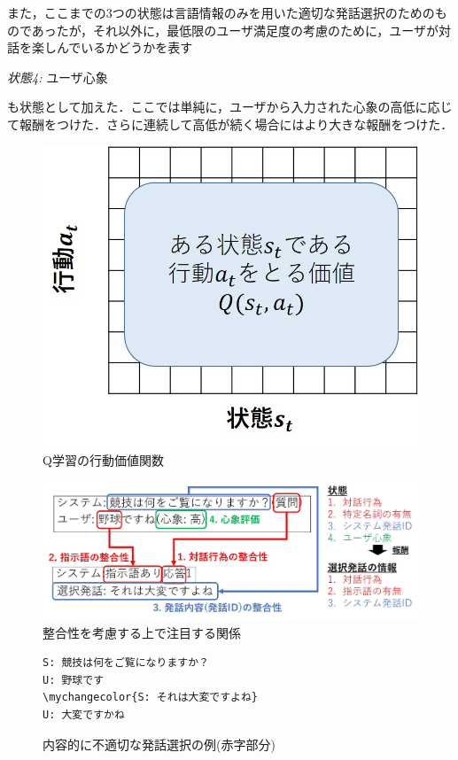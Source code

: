 \documentclass[a4j,dvipdfmx]{jarticle}
\newcommand\mychangecolor[1]{\textcolor[rgb]{1,0,0}{\textbf{#1}}}
\begin{document}
また，ここまでの3つの状態は言語情報のみを用いた適切な発話選択のためのものであったが，それ以外に，最低限のユーザ満足度の考慮のために，ユーザが対話を楽しんでいるかどうかを表す
\begin{description}\item{\emph{状態4: }}ユーザ心象\end{description}
も状態として加えた．ここでは単純に，ユーザから入力された心象の高低に応じて報酬をつけた．さらに連続して高低が続く場合にはより大きな報酬をつけた．






\begin{figure}[tb]
    \centering
    \includegraphics[width=0.5\hsize]{Q_table.jpg}
    \caption{Q学習の行動価値関数}
    \label{Q_table}
\end{figure}

\begin{figure}[tb]
    \centering
    \includegraphics[width=\linewidth]{slud_Qlearning_re3.jpg}
    \caption{整合性を考慮する上で注目する関係}
    \label{Qlearning}
\end{figure}



\begin{figure}[tb]
\begin{screen}
\begin{Verbatim}[commandchars=\\\{\}]
S: 競技は何をご覧になりますか？
U: 野球です
\mychangecolor{S: それは大変ですよね}
U: 大変ですかね
\end{Verbatim}
\end{screen}
\caption{内容的に不適切な発話選択の例(赤字部分)}
\label{hutekisetsu}
\end{figure}
\end{document}
